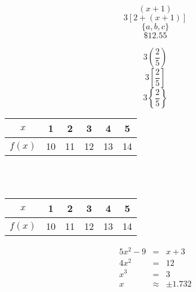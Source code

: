 \documentclass[12pt]{article}
\begin{document}
$$(x+1)$$
$$3[2+(x+1)]$$
$$\{a,b,c\}$$
$$\$12.55$$

$$3\left(\frac{2}{5}\right)$$
$$3\left[\frac{2}{5}\right]$$
$$3\left\{\frac{2}{5}\right\}$$
\begin{tabular}{|c|c|c|c|c|c|}
\hline
$x$ &1 &2 &3 &4 &5\\ \hline
$f(x)$ &10 &11 &12 &13 &14\\ \hline  

\end{tabular}
\\
\\
\begin{tabular}{|c||c|c|c|c|c|}
\hline
$x$ &1 &2 &3 &4 &5\\ \hline
$f(x)$ &10 &11 &12 &13 &14\\ \hline  

\end{tabular}

\begin{eqnarray*}
5x^2-9&=&x+3\\
4x^2 &=&12\\
x^3&=&3\\
x&\approx&\pm1.732
\end{eqnarray*}
\end{document}
